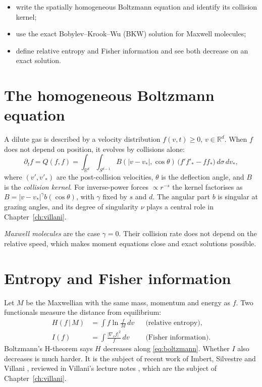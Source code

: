 \documentclass[11pt,a4paper,openany]{book}
\newcommand{\R}{\mathbb{R}}
\theoremstyle{definition}
\theoremstyle{plain}
\begin{document}
\begin{objectives}
\begin{itemize}
  \item write the spatially homogeneous Boltzmann equation and identify its collision kernel;
  \item use the exact Bobylev--Krook--Wu (BKW) solution for Maxwell molecules;
  \item define relative entropy and Fisher information and see both decrease on an exact
        solution.
\end{itemize}
\end{objectives}

\section{The homogeneous Boltzmann equation}

A dilute gas is described by a velocity distribution $f(v,t)\ge0$, $v\in\R^d$. When $f$ does not
depend on position, it evolves by collisions alone:
\begin{equation}
  \partial_tf=Q(f,f)=\int_{\R^d}\int_{S^{d-1}}B(|v-v_*|,\cos\theta)\,
  \bigl(f'f'_*-ff_*\bigr)\,d\sigma\,dv_*,
  \label{eq:boltzmann}
\end{equation}
where $(v',v'_*)$ are the post-collision velocities, $\theta$ is the deflection angle, and $B$ is
the \emph{collision kernel}. For inverse-power forces $\propto r^{-s}$ the kernel factorises as
$B=|v-v_*|^\gamma b(\cos\theta)$, with $\gamma$ fixed by $s$ and $d$. The angular part $b$ is
singular at grazing angles, and its degree of singularity $\nu$ plays a central role in
Chapter~\ref{ch:villani}.

\emph{Maxwell molecules} are the case $\gamma=0$. Their collision rate does not depend on the
relative speed, which makes moment equations close and exact solutions possible.

\section{Entropy and Fisher information}

Let $M$ be the Maxwellian with the same mass, momentum and energy as $f$. Two functionals measure
the distance from equilibrium:
\begin{align}
  H(f\,|\,M)&=\int f\ln\frac fM\,dv &&\text{(relative entropy)},\\
  I(f)&=\int\frac{|\nabla_vf|^2}{f}\,dv &&\text{(Fisher information)}.
\end{align}
Boltzmann's H-theorem says $H$ decreases along \eqref{eq:boltzmann}. Whether $I$ also decreases
is much harder. It is the subject of recent work of Imbert, Silvestre and Villani
\cite{isv2024}, reviewed in Villani's lecture notes \cite{villani2025},
which are the subject of Chapter~\ref{ch:villani}.
\end{document}
